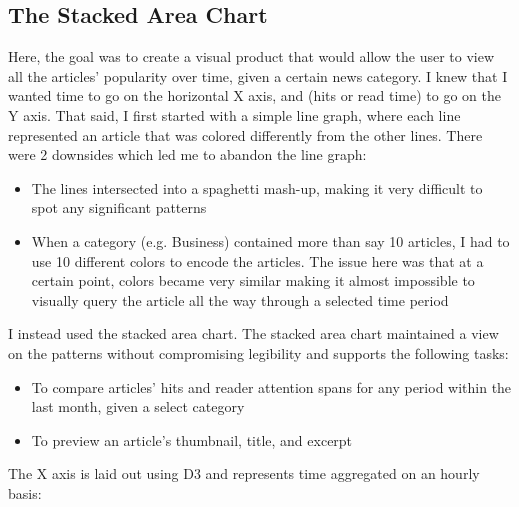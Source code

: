 \documentclass[12pt]{article}
\begin{document}
\subsection{The Stacked Area Chart}

Here, the goal was to create a visual product that would allow the user to view all the articles' popularity over time, given a certain news category. I knew that I wanted time to go on the horizontal X axis, and (hits or read time) to go on the Y axis. That said, I first started with a simple line graph, where each line represented an article that was colored differently from the other lines. There were 2 downsides which led me to abandon the line graph: 
\begin{itemize}
\item The lines intersected into a spaghetti mash-up, making it very difficult to spot any significant patterns
\item When a category (e.g. Business) contained more than say 10 articles, I had to use 10 different colors to encode the articles. The issue here was that at a certain point, colors became very similar making it almost impossible to visually query the article all the way through a selected time period 
\end{itemize}

\noindent I instead used the stacked area chart. The stacked area chart maintained a view on the patterns without compromising legibility and supports the following tasks: 
\begin{itemize}
\item To compare articles' hits and reader attention spans for any period within the last month, given a select category
\item To preview an article's thumbnail, title, and excerpt
\end{itemize}

\noindent The X axis is laid out using D3 and represents time aggregated on an hourly basis: 
\end{document}
